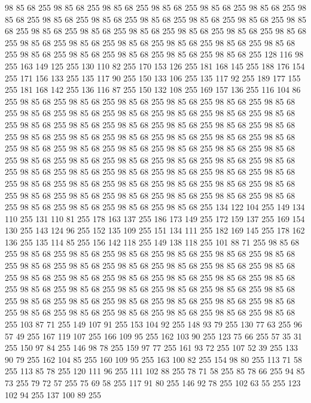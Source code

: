 98 85 68 255 98 85 68 255 98 85 68 255 98 85 68 255 98 85 68 255 98 85 68 255 98 85 68 255 98 85 68 255 98 85 68 255 98 85 68 255 98 85 68 255 98 85 68 255 98 85 68 255 98 85 68 255 98 85 68 255 98 85 68 255 98 85 68 255 98 85 68 255 98 85 68 255 98 85 68 255 98 85 68 255 98 85 68 255 98 85 68 255 98 85 68 255 98 85 68 255 98 85 68 255 98 85 68 255 98 85 68 255 98 85 68 255 98 85 68 255 128 116 98 255 163 149 125 255 130 110 82 255 170 153 126 255 181 168 145 255 188 176 154 255 171 156 133 255 135 117 90 255 150 133 106 255 135 117 92 255 189 177 155 255 181 168 142 255 136 116 87 255 150 132 108 255 169 157 136 255 116 104 86 255 98 85 68 255 98 85 68 255 98 85 68 255 98 85 68 255 98 85 68 255 98 85 68 255 98 85 68 255 98 85 68 255 98 85 68 255 98 85 68 255 98 85 68 255 98 85 68 255 98 85 68 255 98 85 68 255 98 85 68 255 98 85 68 255 98 85 68 255 98 85 68 255
98 85 68 255 98 85 68 255 98 85 68 255 98 85 68 255 98 85 68 255 98 85 68 255 98 85 68 255 98 85 68 255 98 85 68 255 98 85 68 255 98 85 68 255 98 85 68 255 98 85 68 255 98 85 68 255 98 85 68 255 98 85 68 255 98 85 68 255 98 85 68 255 98 85 68 255 98 85 68 255 98 85 68 255 98 85 68 255 98 85 68 255 98 85 68 255 98 85 68 255 98 85 68 255 98 85 68 255 98 85 68 255 98 85 68 255 98 85 68 255 98 85 68 255 98 85 68 255 98 85 68 255 98 85 68 255 98 85 68 255 98 85 68 255 98 85 68 255 98 85 68 255 98 85 68 255 98 85 68 255 134 122 104 255 149 134 110 255 131 110 81 255 178 163 137 255 186 173 149 255 172 159 137 255 169 154 130 255 143 124 96 255 152 135 109 255 151 134 111 255 182 169 145 255 178 162 136 255 135 114 85 255 156 142 118 255 149 138 118 255 101 88 71 255 98 85 68 255 98 85 68 255 98 85 68 255 98 85 68 255 98 85 68 255 98 85 68 255 98 85 68 255 98 85 68 255
98 85 68 255 98 85 68 255 98 85 68 255 98 85 68 255 98 85 68 255 98 85 68 255 98 85 68 255 98 85 68 255 98 85 68 255 98 85 68 255 98 85 68 255 98 85 68 255 98 85 68 255 98 85 68 255 98 85 68 255 98 85 68 255 98 85 68 255 98 85 68 255 98 85 68 255 98 85 68 255 98 85 68 255 98 85 68 255 98 85 68 255 98 85 68 255 98 85 68 255 98 85 68 255 98 85 68 255 98 85 68 255 98 85 68 255 103 87 71 255 149 107 91 255 153 104 92 255 148 93 79 255 130 77 63 255 96 57 49 255 167 119 107 255 166 109 95 255 162 103 90 255 123 75 66 255 57 35 31 255 150 97 84 255 146 98 78 255 159 97 77 255 161 93 72 255 107 52 39 255 133 90 79 255 162 104 85 255 160 109 95 255 163 100 82 255 154 98 80 255 113 71 58 255 113 85 78 255 120 111 96 255 111 102 88 255 78 71 58 255 85 78 66 255 94 85 73 255 79 72 57 255 75 69 58 255 117 91 80 255 146 92 78 255 102 63 55 255 123 102 94 255 137 100 89 255
